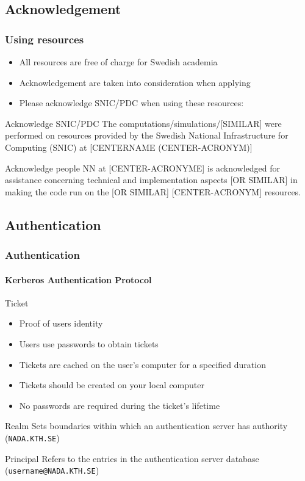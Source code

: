 \subsection*{Acknowledgement }
\frame
{
\frametitle{Using resources}

\begin{itemize}
\item All resources are free of charge for Swedish academia
\item Acknowledgement \alert{are} taken into consideration when applying
\item Please acknowledge SNIC/PDC when using these resources:
\end{itemize}
\begin{alertblock}{Acknowledge SNIC/PDC}
The computations/simulations/[SIMILAR] were performed on resources provided by the Swedish National Infrastructure for Computing (SNIC) at [CENTERNAME (CENTER-ACRONYM)]
\end{alertblock}
\begin{alertblock}{Acknowledge people}
NN at [CENTER-ACRONYME] is acknowledged for assistance concerning technical and implementation aspects [OR SIMILAR] in making the code run on the [OR SIMILAR] [CENTER-ACRONYM] resources.
\end{alertblock}
}



\subsection{Authentication}
\begin{frame}[fragile]
\frametitle{Authentication}
\framesubtitle{\alert{\textbf{Kerberos}} Authentication Protocol}
\footnotesize
\begin{exampleblock}{\large{Ticket}}
\begin{itemize}
  \item Proof of users identity
  \item Users use passwords to obtain tickets
  \item Tickets are cached on the user's computer for a specified duration
  \item Tickets \alert{should be created on your local computer}
  \item No passwords are required during the ticket's lifetime
\end{itemize}
\end{exampleblock}

\begin{exampleblock}{\large{Realm}}
Sets boundaries within which an authentication server has authority (\verb|NADA.KTH.SE|)
\end{exampleblock}

\begin{exampleblock}{\large{Principal}}
Refers to the entries in the authentication server database  (\verb|username@NADA.KTH.SE|)
\end{exampleblock}

\end{frame}

